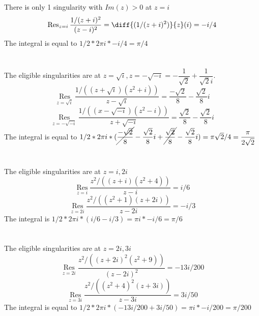 \documentclass[12pt]{article}
\begin{document}
\section{}
There is only 1 singularity with $ Im(z) > 0 $ at $ z = i $ 
\[\operatorname{Res}\limits_{z=i} \dfrac{1/(z+i)^2}{(z-i)^2} = \diff{(1/(z+i)^2)}{z}(i) = -i/4 \]
The integral is equal to $ 1/2 * 2\pi i * -i/4 = \pi/4 $

\section{}
The eligible singularities are at $ z = \sqrt{i}, z = -\sqrt{-i} = -\dfrac{1}{\sqrt{2}} + \dfrac{1}{\sqrt{2}i}$.
\[\operatorname{Res}\limits_{z=\sqrt{i}} \dfrac{1/\left((z+\sqrt{i})(z^2 + i)\right)}{z-\sqrt{i}} = \dfrac{-\sqrt{2}}{8} - \dfrac{\sqrt{2}}{8}i \]
\[\operatorname{Res}\limits_{z=-\sqrt{-i}} \dfrac{1/\left((x-\sqrt{-i})(z^2 - i)\right)}{z+\sqrt{-i}} = \dfrac{\sqrt{2}}{8} - \dfrac{\sqrt{2}}{8}i \]
The integral is equal to $ 1/2 * 2\pi i * (\cancel{\dfrac{-\sqrt{2}}{8}} - \dfrac{\sqrt{2}}{8}i + \cancel{\dfrac{\sqrt{2}}{8}} - \dfrac{\sqrt{2}}{8}i) = \pi \sqrt{2}/4 = \dfrac{\pi}{2\sqrt{2}}$

\section{}
The eligible singularities are at $ z = i, 2i $
\[\operatorname{Res}\limits_{z=i}  \dfrac{z^2/\left((z+i)(z^2 + 4)\right)}{z-i} = i/6 \]
\[\operatorname{Res}\limits_{z=2i}  \dfrac{z^2/\left((z^2+1)(z + 2i)\right)}{z-2i} = -i/3 \]
The integral is $ 1/2 * 2\pi i * (i/6 - i/3) = \pi i *-i/6 = \pi/6 $

\section{}
The eligible singularities are at $ z=2i, 3i $
\[\operatorname{Res}\limits_{z=2i}  \dfrac{z^2/\left((z+2i)^2 (z^2 + 9)\right)}{(z-2i)^2} = -13i/200 \]
\[\operatorname{Res}\limits_{z=3i}  \dfrac{z^2/\left((z^2 + 4)^2(z+3i)\right)}{z-3i} = 3i/50 \]
The integral is equal to $ 1/2 * 2\pi i *(-13i/200 + 3i/50) = \pi i * -i/200 = \pi/200$
\newpage
\end{document}
